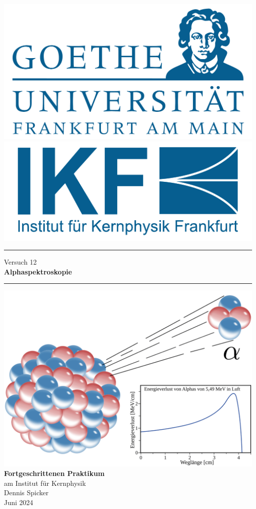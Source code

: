 \documentclass{scrartcl}
\begin{document}
\begin{titlepage}
	\newcommand{\HRule}{\rule{\textwidth}{0.5mm}}
	\begin{center}
	{\includegraphics[width=0.3\linewidth]{img/GU-Logo-blau-CMYK} \hfill
	\includegraphics[width=0.3\linewidth]{img/IKF_Logo} \\ }
	\vspace{1cm}
	\HRule
	\vspace{0.4cm}
	{\huge Versuch 12} \\
	\vspace{0.5cm}
	{\huge {\bfseries Alphaspektroskopie}} \\
	\vspace{0.2cm}
	\HRule
	\vfill
	\includegraphics[width=14cm]{img/front_cover.png}
	\vfill
	{\Large\bfseries Fortgeschrittenen Praktikum} \\
	\vspace{0.3cm}
	{\Large am Institut für Kernphysik} \\
	\vspace{1.5cm}
	{\small 
		Dennis Spicker \\
		Juni 2024
	}
	\end{center} 
	\thispagestyle{empty}
	\clearpage
\end{titlepage}
\setcounter{tocdepth}{2}
\tableofcontents
\clearpage
\end{document}
